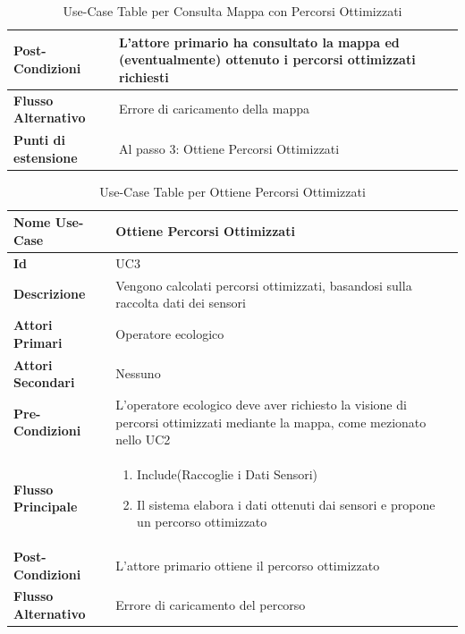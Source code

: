 \begin{table}[h]
\begin{tabular}{|p{4cm}|p{10cm}|}
                \\
                \hline
                \textbf{Post-Condizioni} & L'attore primario ha consultato la mappa ed (eventualmente) ottenuto i percorsi ottimizzati richiesti \\
                \hline
                \textbf{Flusso Alternativo}& Errore di caricamento della mappa \\
                \hline
                \textbf{Punti di estensione}& Al passo 3: Ottiene Percorsi Ottimizzati\\
                \hline
            \end{tabular}
            \caption{Use-Case Table per Consulta Mappa con Percorsi Ottimizzati}
            \label{tab:use_case}
        \end{table}

        \begin{table}[h]
            \centering
            \renewcommand{\arraystretch}{1.3} %
            \begin{tabular}{|p{4cm}|p{10cm}|}
                \hline
                \textbf{Nome Use-Case}& \textbf{Ottiene Percorsi Ottimizzati}\\
                \hline
                \textbf{Id} & UC3 \\
                \hline
                \textbf{Descrizione}& Vengono calcolati percorsi ottimizzati, basandosi sulla raccolta dati dei sensori\\
                \hline
                \textbf{Attori Primari}& Operatore ecologico\\
                \hline
                \textbf{Attori Secondari}& Nessuno\\
                \hline
                \textbf{Pre-Condizioni}& L'operatore ecologico deve aver richiesto la visione di percorsi ottimizzati mediante la mappa, come mezionato nello UC2\\
                \hline
                \textbf{Flusso Principale}& 
                \begin{enumerate}
                    \item Include(Raccoglie i Dati Sensori)
                    \item Il sistema elabora i dati ottenuti dai sensori e propone un percorso ottimizzato
                \end{enumerate}
                \\
                \hline
                \textbf{Post-Condizioni}& L'attore primario ottiene il percorso ottimizzato\\
                \hline
                \textbf{Flusso Alternativo}& Errore di caricamento del percorso\\
                \hline
            \end{tabular}
            \caption{Use-Case Table per Ottiene Percorsi Ottimizzati}
            \label{tab:use_case}
        \end{table}

